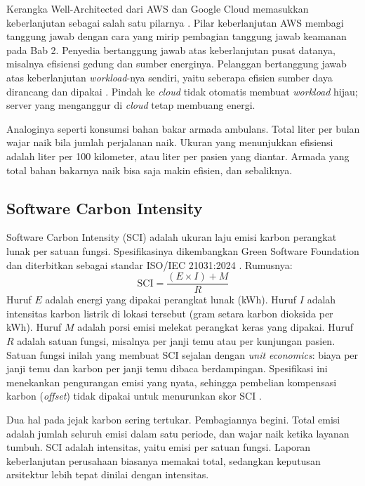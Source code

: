 Kerangka Well-Architected dari AWS dan Google Cloud memasukkan keberlanjutan sebagai salah satu
pilarnya \cite{awswaf,googlewaf}. Pilar keberlanjutan AWS membagi tanggung jawab dengan cara yang
mirip pembagian tanggung jawab keamanan pada Bab 2. Penyedia bertanggung jawab atas keberlanjutan
pusat datanya, misalnya efisiensi gedung dan sumber energinya. Pelanggan bertanggung jawab atas
keberlanjutan \textit{workload}-nya sendiri, yaitu seberapa efisien sumber daya dirancang dan
dipakai \cite{c03-aws-sustainability}. Pindah ke \textit{cloud} tidak otomatis membuat
\textit{workload} hijau; server yang menganggur di \textit{cloud} tetap membuang energi.

Analoginya seperti konsumsi bahan bakar armada ambulans. Total liter per bulan wajar naik bila
jumlah perjalanan naik. Ukuran yang menunjukkan efisiensi adalah liter per 100 kilometer, atau liter
per pasien yang diantar. Armada yang total bahan bakarnya naik bisa saja makin efisien, dan
sebaliknya.

\subsection{Software Carbon Intensity}

Software Carbon Intensity (SCI) adalah ukuran laju emisi karbon perangkat lunak per satuan fungsi.
Spesifikasinya dikembangkan Green Software Foundation dan diterbitkan sebagai standar ISO/IEC
21031:2024 \cite{iso21031,c03-gsf-sci}. Rumusnya:
\[
  \mathrm{SCI} = \frac{(E \times I) + M}{R}
\]
Huruf $E$ adalah energi yang dipakai perangkat lunak (kWh). Huruf $I$ adalah intensitas karbon
listrik di lokasi tersebut (gram setara karbon dioksida per kWh). Huruf $M$ adalah porsi emisi
melekat perangkat keras yang dipakai. Huruf $R$ adalah satuan fungsi, misalnya per janji temu atau
per kunjungan pasien. Satuan fungsi inilah yang membuat SCI sejalan dengan \textit{unit economics}:
biaya per janji temu dan karbon per janji temu dibaca berdampingan. Spesifikasi ini menekankan
pengurangan emisi yang nyata, sehingga pembelian kompensasi karbon (\textit{offset}) tidak dipakai
untuk menurunkan skor SCI \cite{c03-gsf-sci}.

Dua hal pada jejak karbon sering tertukar. Pembagiannya begini. Total emisi adalah jumlah seluruh
emisi dalam satu periode, dan wajar naik ketika layanan tumbuh. SCI adalah intensitas, yaitu emisi
per satuan fungsi. Laporan keberlanjutan perusahaan biasanya memakai total, sedangkan keputusan
arsitektur lebih tepat dinilai dengan intensitas.

